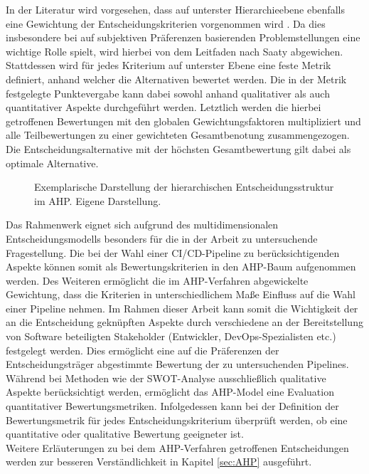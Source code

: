 In der Literatur wird vorgesehen, dass auf unterster Hierarchieebene ebenfalls eine Gewichtung der Entscheidungskriterien vorgenommen wird \cite[86]{Saaty.2008}. Da dies insbesondere bei auf subjektiven Präferenzen basierenden Problemstellungen eine wichtige Rolle spielt, wird hierbei von dem Leitfaden nach Saaty abgewichen. Stattdessen wird für jedes Kriterium auf unterster Ebene eine feste Metrik definiert, anhand welcher die Alternativen bewertet werden. Die in der Metrik festgelegte Punktevergabe kann dabei sowohl anhand qualitativer als auch quantitativer Aspekte durchgeführt werden. Letztlich werden die hierbei getroffenen Bewertungen mit den globalen Gewichtungsfaktoren multipliziert und alle Teilbewertungen zu einer gewichteten Gesamtbenotung zusammengezogen. Die Entscheidungsalternative mit der höchsten Gesamtbewertung gilt dabei als optimale Alternative. 
\begin{center}
	\begin{figure}[H]
		\centering
		\caption[Exemplarische Darstellung der hierarchischen Entscheidungsstruktur im AHP]{Exemplarische Darstellung der hierarchischen Entscheidungsstruktur im AHP. Eigene Darstellung.}
		\label{fig:AHP_B}
	\end{figure}
\end{center}
\vspace*{-10mm}
Das Rahmenwerk eignet sich aufgrund des multidimensionalen Entscheidungsmodells besonders für die in der Arbeit zu untersuchende Fragestellung. Die bei der Wahl einer CI/CD-Pipeline zu berücksichtigenden Aspekte können somit als Bewertungskriterien in den AHP-Baum aufgenommen werden. Des Weiteren ermöglicht die im AHP-Verfahren abgewickelte Gewichtung, dass die Kriterien in unterschiedlichem Maße Einfluss auf die Wahl einer Pipeline nehmen. Im Rahmen dieser Arbeit kann somit die Wichtigkeit der an die Entscheidung geknüpften Aspekte durch verschiedene an der Bereitstellung von Software beteiligten Stakeholder (Entwickler, DevOps-Spezialisten etc.) festgelegt werden. Dies ermöglicht eine auf die Präferenzen der Entscheidungsträger abgestimmte Bewertung der zu untersuchenden Pipelines. Während bei Methoden wie der SWOT-Analyse ausschließlich qualitative Aspekte berücksichtigt werden, ermöglicht das AHP-Model eine Evaluation quantitativer Bewertungsmetriken. Infolgedessen kann bei der Definition der Bewertungsmetrik für jedes Entscheidungskriterium überprüft werden, ob eine quantitative oder qualitative Bewertung geeigneter ist.\\ Weitere Erläuterungen zu bei dem AHP-Verfahren getroffenen Entscheidungen werden zur besseren Verständlichkeit in Kapitel \ref*{sec:AHP} ausgeführt. 